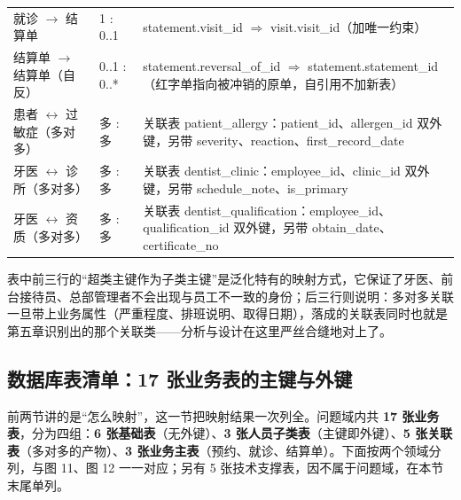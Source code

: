 \documentclass[11pt,a4paper]{ctexart}
\begin{document}
{\begin{longtable}{@{}L{4.4cm}L{1.7cm}L{9.2cm}@{}}
就诊 $\rightarrow$ 结算单 & 1 : 0..1 & statement.visit\_id $\Rightarrow$ visit.visit\_id（加唯一约束） \\
结算单 $\rightarrow$ 结算单（自反） & 0..1 : 0..* & statement.reversal\_of\_id $\Rightarrow$ statement.statement\_id（红字单指向被冲销的原单，自引用不加新表） \\
患者 $\leftrightarrow$ 过敏症（多对多） & 多 : 多 & 关联表 patient\_allergy：patient\_id、allergen\_id 双外键，另带 severity、reaction、first\_record\_date \\
牙医 $\leftrightarrow$ 诊所（多对多） & 多 : 多 & 关联表 dentist\_clinic：employee\_id、clinic\_id 双外键，另带 schedule\_note、is\_primary \\
牙医 $\leftrightarrow$ 资质（多对多） & 多 : 多 & 关联表 dentist\_qualification：employee\_id、qualification\_id 双外键，另带 obtain\_date、certificate\_no \\
\end{longtable}
}

表中前三行的“超类主键作为子类主键”是泛化特有的映射方式，它保证了牙医、前台接待员、总部管理者不会出现与员工不一致的身份；后三行则说明：多对多关联一旦带上业务属性（严重程度、排班说明、取得日期），落成的关联表同时也就是第五章识别出的那个关联类——分析与设计在这里严丝合缝地对上了。

\subsection{数据库表清单：17 张业务表的主键与外键}

前两节讲的是“怎么映射”，这一节把映射结果一次列全。问题域内共 \textbf{17 张业务表}，分为四组：\textbf{6 张基础表}（无外键）、\textbf{3 张人员子类表}（主键即外键）、\textbf{5 张关联表}（多对多的产物）、\textbf{3 张业务主表}（预约、就诊、结算单）。下面按两个领域分列，与图 11、图 12 一一对应；另有 5 张技术支撑表，因不属于问题域，在本节末尾单列。
\end{document}
